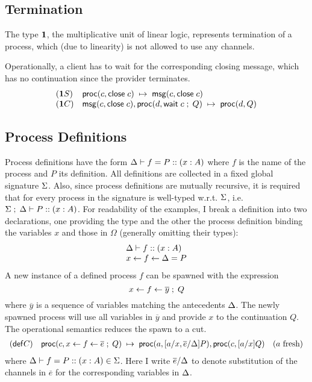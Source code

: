 \subsection*{Termination}
The type $\one$, the multiplicative unit of linear logic, represents
termination of a process, which (due to linearity) is not allowed to use
any channels.
Operationally, a client has to wait for the corresponding closing message,
which has no continuation since the provider terminates.
\[
\begin{array}{ll}
(\one S) & \proc{c}{\eclose{c}} \step \msg{c}{\eclose{c}} \\
(\one C) & \msg{c}{\eclose{c}}, \proc{d}{\ewait{c} \semi Q} \step
\proc{d}{Q}
\end{array}
\]

\subsection*{Process Definitions}
Process definitions have the form $\D \vdash f = P :: (x : A)$ where $f$
is the name of the process and $P$ its definition. All definitions are
collected in a fixed global signature $\Sg$. Also, since process definitions
are mutually recursive, it is required that for every process in the signature
is well-typed w.r.t. $\Sg$, i.e. $\Sg \semi \D \vdash P :: (x : A)$. For
readability of the examples, I break a definition into two declarations,
one providing the type and the other the process definition binding the
variables $x$ and those in $\Omega$ (generally omitting their types):
\[
\begin{array}{l}
\D \vdash f :: (x : A) \\
\procdef{f}{\D}{x} = P
\end{array}
\]
A new instance of a defined process $f$ can be spawned with
the expression
\[
\procdef{f}{\overline{y}}{x} \semi Q
\]
where $\overline{y}$ is a sequence of variables matching the
antecedents $\D$.  The newly spawned process will use all
variables in $\overline{y}$ and provide $x$ to the continuation $Q$.
The operational semantics reduces the spawn to a cut.
\[
\begin{array}{ll}
(\m{def} C) &
\proc{c}{x \leftarrow f \leftarrow \overline{e} \semi Q}
\step \proc{a}{[a/x, \overline{e}/\D]P},
\proc{c}{[a/x]Q}
\quad \fresh{a}
\end{array}
\]
where $\D \vdash f = P :: (x : A) \in \Sg$.
Here I write $\overline{e}/\D$ to denote substitution of the
channels in $\overline{e}$ for the corresponding variables in
$\D$.


